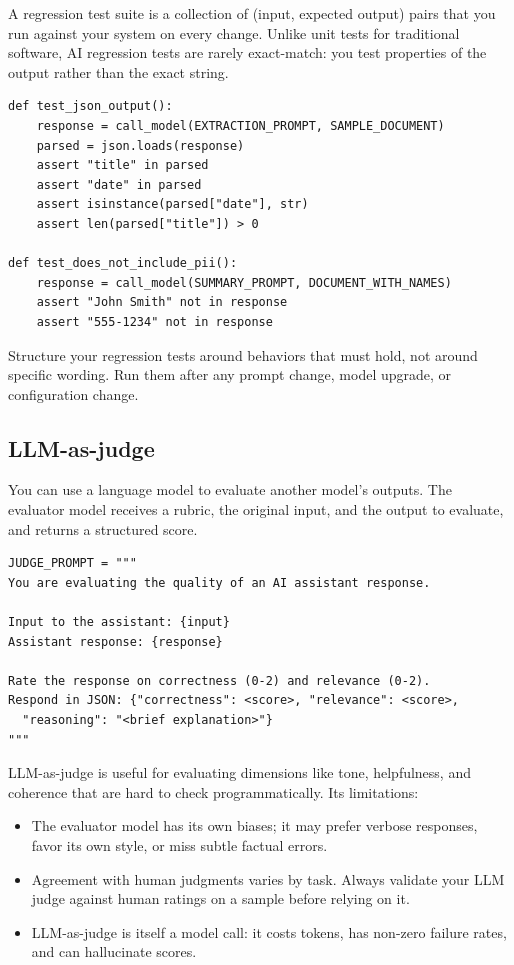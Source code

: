A regression test suite is a collection of (input, expected output) pairs that you run against your system on every change. Unlike unit tests for traditional software, AI regression tests are rarely exact-match: you test properties of the output rather than the exact string.

\begin{verbatim}
def test_json_output():
    response = call_model(EXTRACTION_PROMPT, SAMPLE_DOCUMENT)
    parsed = json.loads(response)
    assert "title" in parsed
    assert "date" in parsed
    assert isinstance(parsed["date"], str)
    assert len(parsed["title"]) > 0

def test_does_not_include_pii():
    response = call_model(SUMMARY_PROMPT, DOCUMENT_WITH_NAMES)
    assert "John Smith" not in response
    assert "555-1234" not in response
\end{verbatim}

Structure your regression tests around behaviors that must hold, not around specific wording. Run them after any prompt change, model upgrade, or configuration change.

\subsection{LLM-as-judge}

You can use a language model to evaluate another model's outputs. The evaluator model receives a rubric, the original input, and the output to evaluate, and returns a structured score.

\begin{verbatim}
JUDGE_PROMPT = """
You are evaluating the quality of an AI assistant response.

Input to the assistant: {input}
Assistant response: {response}

Rate the response on correctness (0-2) and relevance (0-2).
Respond in JSON: {"correctness": <score>, "relevance": <score>,
  "reasoning": "<brief explanation>"}
"""
\end{verbatim}

LLM-as-judge is useful for evaluating dimensions like tone, helpfulness, and coherence that are hard to check programmatically. Its limitations:

\begin{itemize}[noitemsep,topsep=0pt]
  \item The evaluator model has its own biases; it may prefer verbose responses, favor its own style, or miss subtle factual errors.
  \item Agreement with human judgments varies by task. Always validate your LLM judge against human ratings on a sample before relying on it.
  \item LLM-as-judge is itself a model call: it costs tokens, has non-zero failure rates, and can hallucinate scores.
\end{itemize}

